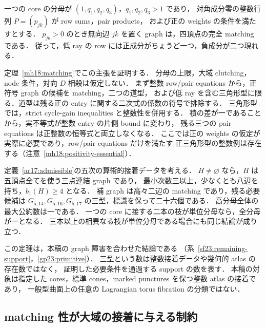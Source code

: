 \begin{theorem}
\label{ar18:main-matching}
一つの core の分母が $(1,q_1,q_2,q_3)$，$q_1,q_2,q_3>1$ であり，
対角成分零の整数行列 $P=(p_{jk})$ が row sums，pair products，
および正の weights の条件を満たすとする．
$p_{jk}>0$ のとき無向辺 $jk$ を置く graph は，四頂点の完全 matching である．
従って，低 ray の row には正成分がちょうど一つ，負成分が二つ現れる．
\end{theorem}

定理~\ref{mh18:matching}でこの主張を証明する．
分母の上限，大域 clutching，node 条件，対向 $D$ 相殺は仮定しない．
まず整数 row/pair equations から，正符号 graph の候補を matching，二つの道型，
および低 ray を含む三角形型に限る．道型は残る正の entry に関する二次式の係数の符号で排除する．
三角形型では，strict cycle-gain inequalities と整数性を併用する．
積の差が一であることから，実不等式が整数 entry の片側 bound に変わり，
残る三つの pair equations は正整数の恒等式と両立しなくなる．
ここでは正の weights の仮定が実際に必要であり，row/pair equations だけを満たす
正三角形型の整数例は存在する（注意~\ref{mh18:positivity-essential}）．

\begin{theorem}
\label{ar17:main-support}
定義~\ref{ar17:admissible}の五次の算術的接着データを考える．
$H\ne\varnothing$ なら，$H$ は五頂点全てを使う三点連結 graph であり，
最小次数三以上，少なくとも八辺を持ち，$b_1(H)\ge4$ となる．
補 graph は高々二辺の matching であり，残る必要候補は
$G_{5,14},G_{5,16},G_{5,17}$ の三型，標識を保って二十六個である．
高分母全体の最大公約数は一である．
一つの core に接する二本の枝が単位分母なら，全分母が一となる．
三本以上の相異なる枝が単位分母である場合にも同じ結論が成り立つ．
\end{theorem}

この定理は，本稿の graph 障害を合わせた結論である
（系~\ref{sf23:remaining-support}，\ref{gp23:primitive}）．
三型という数は整数接着データや幾何的 atlas の存在数ではなく，
証明した必要条件を通過する support の数を表す．
本稿の対象は指定した cores，標準 cones，marked punctures を保つ整数 atlas の接着であり，
一般型曲面上の任意の Lagrangian torus fibration の分類ではない．

\subsection{matching 性が大域の接着に与える制約}

